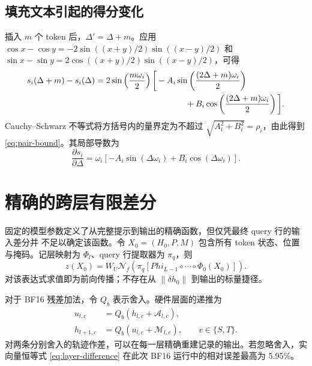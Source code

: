 \subsection{填充文本引起的得分变化}

插入 $m$ 个 token 后，$\Delta' = \Delta+m$。应用
$\cos x-\cos y=-2\sin((x+y)/2)\sin((x-y)/2)$ 和
$\sin x-\sin y=2\cos((x+y)/2)\sin((x-y)/2)$，可得
\begin{align}
  s_i(\Delta+m)-s_i(\Delta)
  &=2\sin\left(\frac{m\omega_i}{2}\right)
  \bigg[
  -A_i\sin\left(\frac{(2\Delta+m)\omega_i}{2}\right)\\
  &\hspace{38mm}+B_i\cos\left(\frac{(2\Delta+m)\omega_i}{2}\right)
  \bigg].
\end{align}
Cauchy--Schwarz 不等式将方括号内的量界定为不超过
$\sqrt{A_i^2+B_i^2}=\rho_i$，由此得到 \cref{eq:pair-bound}。其局部导数为
\begin{equation}
  \frac{\partial s_i}{\partial\Delta}
  =\omega_i[-A_i\sin(\Delta\omega_i)+B_i\cos(\Delta\omega_i)].
\end{equation}

\section{精确的跨层有限差分}
\label{app:layerwise}

固定的模型参数定义了从完整提示到输出的精确函数，但仅凭最终 query 行的输入差分并
不足以确定该函数。令 $X_0=(H_0,P,M)$ 包含所有 token 状态、位置与掩码。记层映射为
$\Phi_l$、query 行提取器为 $\pi_q$，则
\begin{equation}
  z(X_0)=W_U\mathcal N_f\left(\pi_q[Phi_{L-1}\circ\cdots\circ\Phi_0(X_0)]\right).
\end{equation}
对该表达式求值即为前向传播；不存在从 $\|\delta h_0\|$ 到输出的标量捷径。

对于 BF16 残差加法，令 $Q_b$ 表示舍入。硬件层面的递推为
\begin{align}
  u_{l,c}&=Q_b(h_{l,c}+\mathcal A_{l,c}),\\
  h_{l+1,c}&=Q_b(u_{l,c}+\mathcal M_{l,c}),\qquad c\in\{S,T\}.
\end{align}
对两条分别舍入的轨迹作差，可以在每一层精确重建记录的输出。若忽略舍入，实向量恒等式
\cref{eq:layer-difference} 在此次 BF16 运行中的相对误差最高为 5.95\%。


